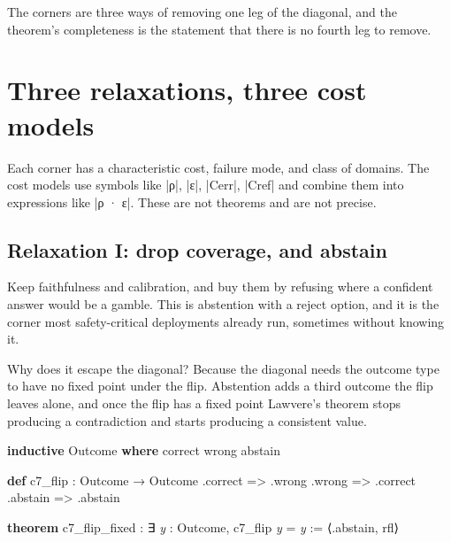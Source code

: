 \documentclass{memoir}
\begin{document}
The corners are three ways of removing one leg of the diagonal, and the
theorem's completeness is the statement that there is no fourth leg to remove.



\section{Three relaxations, three cost models}\label{Two--Schemas--of--Impossibility-005F-005F-005F--Machine--Checked--Limits--of--Trustworthy--Machine--Learning-005F-005F-005F--and--Why--They--Tighten--with--Capability----What--It--Means--for--AI--Safety----Three--relaxations-005F-005F-005F--three--cost--models}

Each corner has a characteristic cost, failure mode, and class of domains. The
cost models use symbols like \LeanVerb|ρ|, \LeanVerb|ε|, \LeanVerb|Cerr|, \LeanVerb|Cref| and combine them into
expressions like \LeanVerb|ρ · ε|. These are not theorems and are not precise.



\subsection{Relaxation I: drop coverage, and abstain}\label{Two--Schemas--of--Impossibility-005F-005F-005F--Machine--Checked--Limits--of--Trustworthy--Machine--Learning-005F-005F-005F--and--Why--They--Tighten--with--Capability----What--It--Means--for--AI--Safety----Three--relaxations-005F-005F-005F--three--cost--models----Relaxation--I-005F-005F-005F--drop--coverage-005F-005F-005F--and--abstain}

Keep faithfulness and calibration, and buy them by refusing where a confident
answer would be a gamble. This is abstention with a reject option, and it is the
corner most safety-critical deployments already run, sometimes without knowing
it.

Why does it escape the diagonal? Because the diagonal needs the outcome type to
have no fixed point under the flip. Abstention adds a third outcome the flip
leaves alone, and once the flip has a fixed point Lawvere's theorem stops
producing a contradiction and starts producing a consistent value.

\begin{LeanVerbatim}
\textbf{inductive} Outcome \textbf{where}
   correct
   wrong
   abstain

\textbf{def} c7_flip : Outcome → Outcome
   .correct => .wrong
   .wrong   => .correct
   .abstain => .abstain

\textbf{theorem} c7_flip_fixed : ∃ \textit{y} : Outcome, c7_flip \textit{y} = \textit{y} :=
  ⟨.abstain, rfl⟩

\end{LeanVerbatim}
\end{document}
